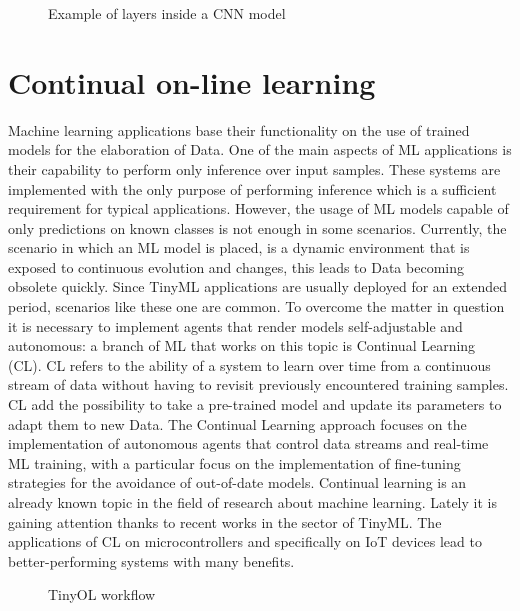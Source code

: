 \begin{figure}[!ht]
\centerline{}
\caption{Example of layers inside a CNN model}
\label{cnn_neural_network}
\end{figure}

\section{Continual on-line learning}
\label{sec:CL}
\quad Machine learning applications base their functionality on the use of trained models for the elaboration of Data. One of the main aspects of ML applications is their capability to perform only inference over input samples. These systems are implemented with the only purpose of performing inference which is a sufficient requirement for typical applications. However, the usage of ML models capable of only predictions on known classes is not enough in some scenarios.
Currently, the scenario in which an ML model is placed, is a dynamic environment that is exposed to continuous evolution and changes, this leads to Data becoming obsolete quickly. Since TinyML applications are usually deployed for an extended period, scenarios like these one are common. To overcome the matter in question it is necessary to implement agents that render models self-adjustable and autonomous: a branch of ML that works on this topic is Continual Learning (CL). CL refers to the ability of a system to learn over time from a continuous stream of data without having to revisit previously encountered training samples. CL add the possibility to take a pre-trained model and update its parameters to adapt them to new Data. The Continual Learning approach focuses on the implementation of autonomous agents that control data streams and real-time ML training, with a particular focus on the implementation of fine-tuning strategies for the avoidance of out-of-date models. Continual learning is an already known topic in the field of research about machine learning. Lately it is gaining attention thanks to recent works in the sector of TinyML. The applications of CL on microcontrollers and specifically on IoT devices lead to better-performing systems with many benefits.

\begin{figure}[!ht]
\centerline{}
\caption{TinyOL workflow}
\label{OL_network}
\end{figure}

